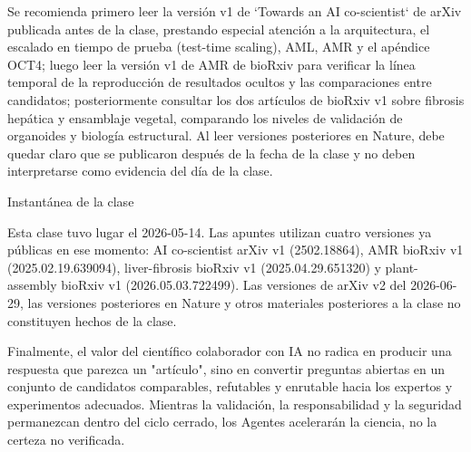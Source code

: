 Se recomienda primero leer la versión v1 de `Towards an AI co-scientist` de arXiv publicada antes de la clase, prestando especial atención a la arquitectura, el escalado en tiempo de prueba (test-time scaling), AML, AMR y el apéndice OCT4; luego leer la versión v1 de AMR de bioRxiv para verificar la línea temporal de la reproducción de resultados ocultos y las comparaciones entre candidatos; posteriormente consultar los dos artículos de bioRxiv v1 sobre fibrosis hepática y ensamblaje vegetal, comparando los niveles de validación de organoides y biología estructural. Al leer versiones posteriores en Nature, debe quedar claro que se publicaron después de la fecha de la clase y no deben interpretarse como evidencia del día de la clase.

\begin{knowledgebox}{Instantánea de la clase}
\raggedright
Esta clase tuvo lugar el 2026-05-14. Las apuntes utilizan cuatro versiones ya públicas en ese momento: AI co-scientist arXiv v1 (2502.18864), AMR bioRxiv v1 (2025.02.19.639094), liver-fibrosis bioRxiv v1 (2025.04.29.651320) y plant-assembly bioRxiv v1 (2026.05.03.722499). Las versiones de arXiv v2 del 2026-06-29, las versiones posteriores en Nature y otros materiales posteriores a la clase no constituyen hechos de la clase.
\end{knowledgebox}

\enlargethispage{3\baselineskip}
Finalmente, el valor del científico colaborador con IA no radica en producir una respuesta que parezca un "artículo", sino en convertir preguntas abiertas en un conjunto de candidatos comparables, refutables y enrutable hacia los expertos y experimentos adecuados. Mientras la validación, la responsabilidad y la seguridad permanezcan dentro del ciclo cerrado, los Agentes acelerarán la ciencia, no la certeza no verificada.


